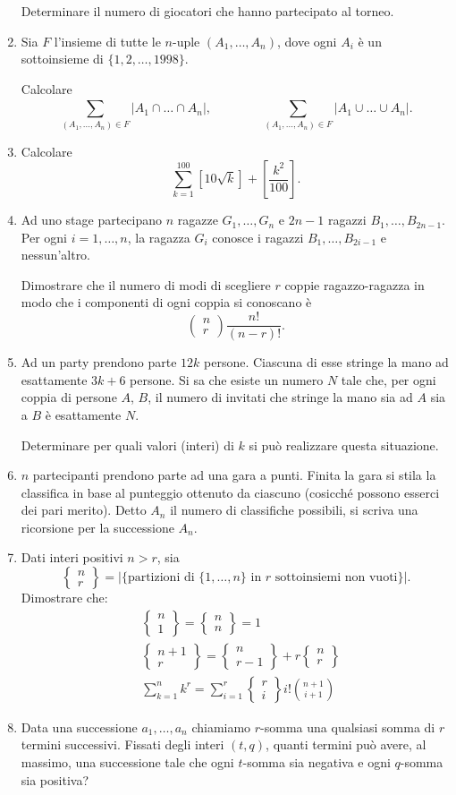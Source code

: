 \documentclass[a4paper,10pt]{article}
\newcommand{\Stirling}[2]
{
	\left\{\!
	\begin{array}{c}
		#1\\
		#2
	\end{array}
	\!\right\}
}
\begin{document}
\begin{enumerate}
	Determinare il numero di giocatori che hanno partecipato al torneo.

	\item  Sia $F$ l'insieme di tutte le $n$-uple $(A_{1},\ldots,A_{n})$, dove ogni $A_{i}$ \`{e} un sottoinsieme di $\{1,2,\ldots,1998\}$.

	Calcolare
	$$\sum_{(A_{1},\ldots,A_{n})\in F}^{}\left|A_{1}\cap\ldots\cap A_{n}\right|,
	\hspace{4em}
	\sum_{(A_{1},\ldots,A_{n})\in F}^{}\left|A_{1}\cup\ldots\cup A_{n}\right|.$$

	\item  Calcolare
	$$\sum_{k=1}^{100}\left[10\sqrt{k}\right]+\left[\frac{k^{2}}{100}\right].$$

	\item Ad uno stage partecipano $n$ ragazze $G_{1},\ldots,G_{n}$ e $2n-1$ ragazzi $B_{1},\ldots,B_{2n-1}$.  Per ogni $i=1,\ldots,n$, la ragazza $G_{i}$ conosce i ragazzi $B_{1},\ldots,B_{2i-1}$ e nessun'altro.

	Dimostrare che il numero di modi di scegliere $r$ coppie ragazzo-ragazza in modo che i componenti di ogni coppia si conoscano \`{e}
	$$\left(\!
	\begin{array}{c}
		n  \\
		r
	\end{array}\!
	\right)\frac{n!}{(n-r)!}.$$

	\item  Ad un party prendono parte $12k$ persone. Ciascuna di esse stringe la mano ad esattamente $3k+6$ persone. Si sa che esiste un numero $N$ tale che, per ogni coppia di persone $A$, $B$, il numero di invitati che stringe la mano sia ad $A$ sia a $B$ \`{e} esattamente $N$.

	Determinare per quali valori (interi) di $k$ si pu\`{o} realizzare questa situazione.

	\item $n$ partecipanti prendono parte ad una gara a punti. Finita la gara si stila la classifica in base al punteggio ottenuto da ciascuno (cosicch\'e possono esserci dei pari merito). Detto $A_n$ il numero di classifiche possibili, si scriva una ricorsione per la successione $A_n$.
	
	\item Dati interi positivi $n > r$, sia
	$$ \Stirling n r = |\{\text{partizioni di } \{1,\dots,n\} \text{ in } r \text{ sottoinsiemi non vuoti}\}|.$$
	Dimostrare che:
	\begin{align*}
		& \Stirling n 1 = \Stirling n n = 1\\
		& \Stirling{n+1}{r} = \Stirling{n}{r-1} + r \Stirling n r \\
		& \sum_{k=1}^{n} k^r = \sum_{i=1}^{r} \Stirling{r}{i} i! \binom{n+1}{i+1}
	\end{align*}
	
	\item Data una successione $a_1, \dots, a_n$ chiamiamo $r$-somma una qualsiasi somma di $r$ termini successivi. Fissati degli interi $(t,q)$, quanti termini pu\`o avere, al massimo, una successione tale che ogni $t$-somma sia negativa e ogni $q$-somma sia positiva?

\end{enumerate}
\bigskip\bigskip
\end{document}

